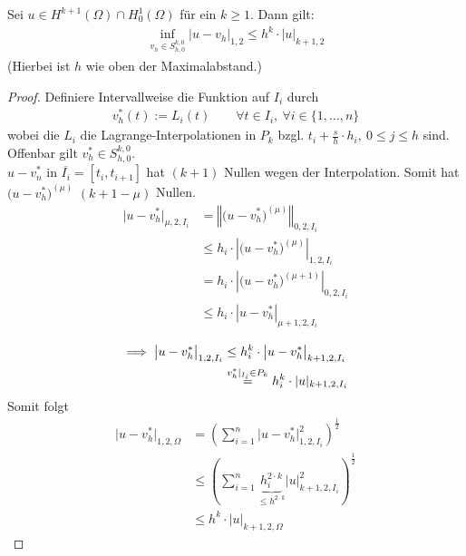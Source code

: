 \begin{theorem}\label{theorem4.2}\enter
Sei $u\in H^{k+1}(\Omega)\cap H^{1}_0(\Omega)$ für ein $k\geq1$. Dann gilt:
\begin{align*}
	\inf\limits_{v_h\in S_{h,0}^{k,0}}\big|u-v_h\big|_{1,2}\leq h^k\cdot|u|_{k+1,2}
\end{align*}
(Hierbei ist $h$ wie oben der Maximalabstand.)
\end{theorem}
\begin{proof}
Definiere Intervallweise die Funktion auf $I_i$ durch
\begin{align*}
v_h^\ast(t):=L_i(t)\qquad\forall t\in I_i,~\forall i\in\lbrace1,\ldots,n\rbrace
\end{align*}
wobei die $L_i$ die Lagrange-Interpolationen in $P_k$ bzgl. $t_i+\frac{s}{h}\cdot h_i,~0\leq j\leq h$ sind.\\
Offenbar gilt $v_h^\ast\in S^{k,0}_{h,0}$. \\
$u-v_n^\ast$ in $\overline{I_i}=[t_i,t_{i+1}]$ hat $(k+1)$ Nullen wegen der Interpolation. Somit hat $\big(u-v_h^\ast)^{(\mu)}$ $(k+1-\mu)$ Nullen.
\begin{align*}
\big|u-v_h^\ast\big|_{\mu,2,I_i}
&=\left\Vert \big(u-v_h^\ast\big)^{(\mu)}\right\Vert_{0,2,I_i}\\
&\stackrel{}{\leq}
h_i\cdot\left|\big(u-v_h^\ast\big)^{(\mu)}\right|_{1,2,I_i}\\
&=h_i\cdot\left|\big(u-v_h^\ast\big)^{(\mu+1)}\right|_{0,2,I_i}\\
&\leq h_i\cdot\left|u-v_h^\ast\right|_{\mu+1,2,I_i}\\
\end{align*}
\begin{align*}
\implies
\big|u-v_h^\ast\big|_{1,2,I_i}
&\leq h_i^k\cdot\big|u-v_h^\ast\big|_{k+1,2,I_i} \\
&\stackrel{v_h^\ast|_{I_i}\in P_k}{=}h_i^k\cdot |u|_{k+1,2,I_i}
\end{align*} 
Somit folgt
\begin{align*}
\big| u-v_h^\ast\big|_{1,2,\Omega}
&=\left(\sum\limits_{i=1}^n\big|u-v_h^\ast\big|^2_{1,2,I_i}\right)^{\frac{1}{2}}\\
&\leq\left(\sum\limits_{i=1}^n \underbrace{h_i^{2\cdot k}}_{\leq h^{2\cdot k}} \big|u\big|^2_{k+1,2,I_i}\right)^{\frac{1}{2}}\\
&\leq h^k\cdot |u|_{k+1,2,\Omega}
\end{align*}
\end{proof}

